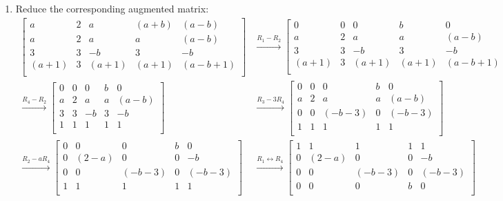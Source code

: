 \documentclass[12pt, a4paper]{article}
\begin{document}
\begin{enumerate}[Q\arabic*.]
  \item Reduce the corresponding augmented matrix:
    \begin{align*}
      \begin{bmatrix}
        a & 2 & a & (a+b) & (a-b)\\
        a & 2 & a & a & (a-b)\\
        3 & 3 & -b & 3 & -b\\
        (a+1) & 3 & (a+1) & (a+1) & (a-b+1)\\
      \end{bmatrix}
      &\xrightarrow{R_1-R_2}
      \begin{bmatrix}
        0 & 0 & 0 & b & 0\\
        a & 2 & a & a & (a-b)\\
        3 & 3 & -b & 3 & -b\\
        (a+1) & 3 & (a+1) & (a+1) & (a-b+1)\\
      \end{bmatrix}\\
      \xrightarrow{R_4-R_2}
      \begin{bmatrix}
        0 & 0 & 0 & b & 0\\
        a & 2 & a & a & (a-b)\\
        3 & 3 & -b & 3 & -b\\
        1 & 1 & 1 & 1 & 1\\
      \end{bmatrix}
      &\xrightarrow{R_3-3R_4}
      \begin{bmatrix}
        0 & 0 & 0 & b & 0\\
        a & 2 & a & a & (a-b)\\
        0 & 0 & (-b-3) & 0 & (-b-3)\\
        1 & 1 & 1 & 1 & 1\\
      \end{bmatrix}\\
      \xrightarrow{R_2-aR_4}
      \begin{bmatrix}
        0 & 0 & 0 & b & 0\\
        0 & (2-a) & 0 & 0 & -b\\
        0 & 0 & (-b-3) & 0 & (-b-3)\\
        1 & 1 & 1 & 1 & 1\\
      \end{bmatrix}
      &\xrightarrow{R_1\leftrightarrow R_4}
      \begin{bmatrix}
        1 & 1 & 1 & 1 & 1\\
        0 & (2-a) & 0 & 0 & -b\\
        0 & 0 & (-b-3) & 0 & (-b-3)\\
        0 & 0 & 0 & b & 0\\
      \end{bmatrix}\\
    \end{align*}


\end{enumerate}
\end{document}
